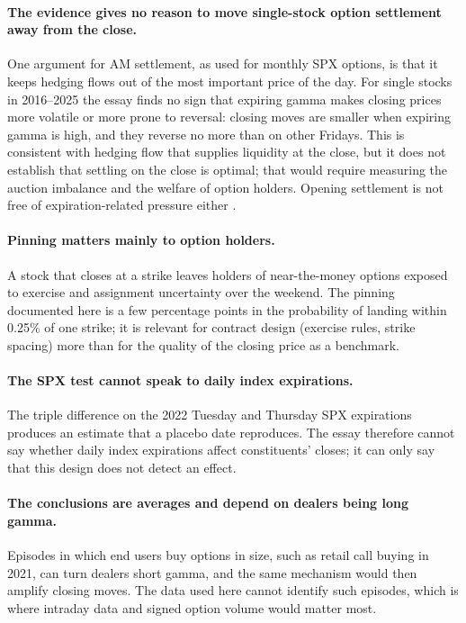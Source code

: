 \documentclass[11pt,a4paper]{article}
\begin{document}
\paragraph{The evidence gives no reason to move single-stock option settlement away from the close.} One argument for AM settlement, as used for monthly SPX options, is that it keeps hedging flows out of the most important price of the day. For single stocks in 2016--2025 the essay finds no sign that expiring gamma makes closing prices more volatile or more prone to reversal: closing moves are smaller when expiring gamma is high, and they reverse no more than on other Fridays. This is consistent with hedging flow that supplies liquidity at the close, but it does not establish that settling on the close is optimal; that would require measuring the auction imbalance and the welfare of option holders. Opening settlement is not free of expiration-related pressure either \citep{BaltussenTersteggeWhelan2024}.

\paragraph{Pinning matters mainly to option holders.} A stock that closes at a strike leaves holders of near-the-money options exposed to exercise and assignment uncertainty over the weekend. The pinning documented here is a few percentage points in the probability of landing within 0.25\% of one strike; it is relevant for contract design (exercise rules, strike spacing) more than for the quality of the closing price as a benchmark.

\paragraph{The SPX test cannot speak to daily index expirations.} The triple difference on the 2022 Tuesday and Thursday SPX expirations produces an estimate that a placebo date reproduces. The essay therefore cannot say whether daily index expirations affect constituents' closes; it can only say that this design does not detect an effect.

\paragraph{The conclusions are averages and depend on dealers being long gamma.} Episodes in which end users buy options in size, such as retail call buying in 2021, can turn dealers short gamma, and the same mechanism would then amplify closing moves. The data used here cannot identify such episodes, which is where intraday data and signed option volume would matter most.
\end{document}
